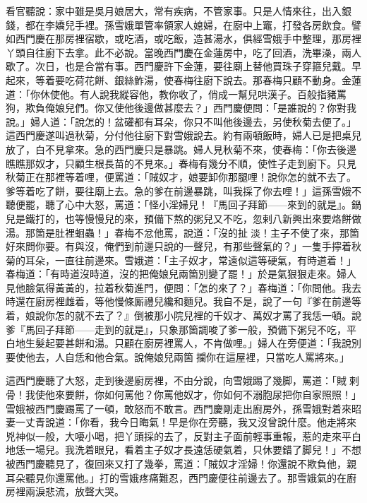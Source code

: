 看官聽說：家中雖是吳月娘居大，常有疾病，不管家事。只是人情來往，出入銀錢，都在李嬌兒手裡。孫雪娥單管率領家人媳婦，在廚中上竈，打發各房飲食。譬如西門慶在那房裡宿歇，或吃酒，或吃飯，造甚湯水，俱經雪娥手中整理，那房裡丫頭自往廚下去拿。此不必說。當晚西門慶在金蓮房中，吃了回酒，洗畢澡，兩人歇了。次日，也是合當有事。西門慶許下金蓮，要往廟上替他買珠子穿箍兒戴。早起來，等着要吃荷花餅、銀絲鮓湯，{}使春梅往廚下說去。那春梅只顧不動身。金蓮道：「你休使他。{}有人說我縱容他，教你收了，俏成一幫兒哄漢子。百般指豬罵狗，欺負俺娘兒們。你又使他後邊做甚麼去？」西門慶便問：「是誰說的？你對我說。」婦人道：「說怎的！盆礶都有耳朵，{}你只不叫他後邊去，另使秋菊去便了。」這西門慶遂叫過秋菊，分付他往廚下對雪娥說去。約有兩頓飯時，婦人已是把桌兒放了，{}白不見拿來。急的西門慶只是暴跳。婦人見秋菊不來，使春梅：「你去後邊瞧瞧那奴才，只顧生根長苗的不見來。」春梅有幾分不順，使性子走到廚下。只見秋菊正在那裡等着哩，便罵道：「賊奴才，娘要卸你那腿哩！說你怎的就不去了。爹等着吃了餅，要往廟上去。急的爹在前邊暴跳，叫我採了你去哩！」這孫雪娥不聽便罷，聽了心中大怒，罵道：「怪小淫婦兒！『馬回子拜節——來到的就是』。鍋兒是鐵打的，也等慢慢兒的來，預備下熬的粥兒又不吃，忽剌八新興出來要烙餅做湯。那箇是肚裡蛔蟲！」{}春梅不忿他罵，說道：「沒的扯𣭈淡！{}主子不使了來，那箇好來問你要。有與沒，俺們到前邊只說的一聲兒，有那些聲氣的？」一隻手擰着秋菊的耳朵，一直往前邊來。雪娥道：「主子奴才，常遠似這等硬氣，有時道着！」春梅道：「有時道沒時道，沒的把俺娘兒兩箇別變了罷！」於是氣狠狠走來。婦人見他臉氣得黃黃的，拉着秋菊進門，便問：「怎的來了？」春梅道：「你問他。我去時還在廚房裡雌着，等他慢條厮禮兒纔和麵兒。我自不是，說了一句『爹在前邊等着，娘說你怎的就不去了？』倒被那小院兒裡的{}千奴才、萬奴才罵了我恁一頓。說爹『馬回子拜節——走到的就是』，只象那箇調唆了爹一般，預備下粥兒不吃，平白地生髮起要甚餅和湯。只顧在廚房裡罵人，不肯做哩。」婦人在旁便道：「我說別要使他去，{}人自恁和他合氣。說俺娘兒兩箇𢺞攔你在這屋裡，只當吃人罵將來。」

這西門慶聽了大怒，走到後邊廚房裡，不由分說，向雪娥踢了幾脚，罵道：「賊𢱉剌骨！我使他來要餅，你如何罵他？你罵他奴才，你如何不溺胞尿把你自家照照！」{}雪娥被西門慶踢罵了一頓，敢怒而不敢言。西門慶剛走出廚房外，孫雪娥對着來昭妻一丈青說道：「你看，我今日晦氣！早是你在旁聽，我又沒曾說什麼。他走將來兇神似一般，大喓小喝，把丫頭採的去了，反對主子面前輕事重報，惹的走來平白地恁一場兒。我洗着眼兒，看着主子奴才長遠恁硬氣着，只休要錯了脚兒！」不想被西門慶聽見了，復回來又打了幾拳，{}罵道：「賊奴才淫婦！你還說不欺負他，親耳朵聽見你還罵他。」打的雪娥疼痛難忍，西門慶便往前邊去了。那雪娥氣的在廚房裡兩淚悲流，放聲大哭。

